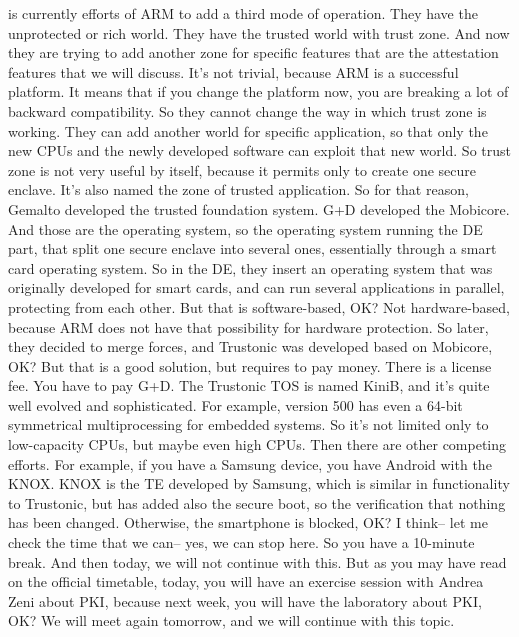  is currently efforts of ARM to add a third mode of operation. They have the
 unprotected or rich world. They have the trusted world with trust zone. And
 now they are trying to add another zone for specific features that are the
 attestation features that we will discuss. It's not trivial, because ARM is a
 successful platform. It means that if you change the platform now, you are
 breaking a lot of backward compatibility. So they cannot change the way in
 which trust zone is working. They can add another world for specific
 application, so that only the new CPUs and the newly developed software can
 exploit that new world. So trust zone is not very useful by itself, because it
 permits only to create one secure enclave. It's also named the zone of trusted
 application. So for that reason, Gemalto developed the trusted foundation
 system. G+D developed the Mobicore. And those are the operating system, so the
 operating system running the DE part, that split one secure enclave into
 several ones, essentially through a smart card operating system. So in the DE,
 they insert an operating system that was originally developed for smart cards,
 and can run several applications in parallel, protecting from each other. But
 that is software-based, OK? Not hardware-based, because ARM does not have that
 possibility for hardware protection. So later, they decided to merge forces,
 and Trustonic was developed based on Mobicore, OK? But that is a good
 solution, but requires to pay money. There is a license fee. You have to pay
 G+D. The Trustonic TOS is named KiniB, and it's quite well evolved and
 sophisticated. For example, version 500 has even a 64-bit symmetrical
 multiprocessing for embedded systems. So it's not limited only to low-capacity
 CPUs, but maybe even high CPUs. Then there are other competing efforts. For
 example, if you have a Samsung device, you have Android with the KNOX. KNOX is
 the TE developed by Samsung, which is similar in functionality to Trustonic,
 but has added also the secure boot, so the verification that nothing has been
 changed. Otherwise, the smartphone is blocked, OK? I think-- let me check the
 time that we can-- yes, we can stop here. So you have a 10-minute break. And
 then today, we will not continue with this. But as you may have read on the
 official timetable, today, you will have an exercise session with Andrea Zeni
 about PKI, because next week, you will have the laboratory about PKI, OK? We
 will meet again tomorrow, and we will continue with this topic.

